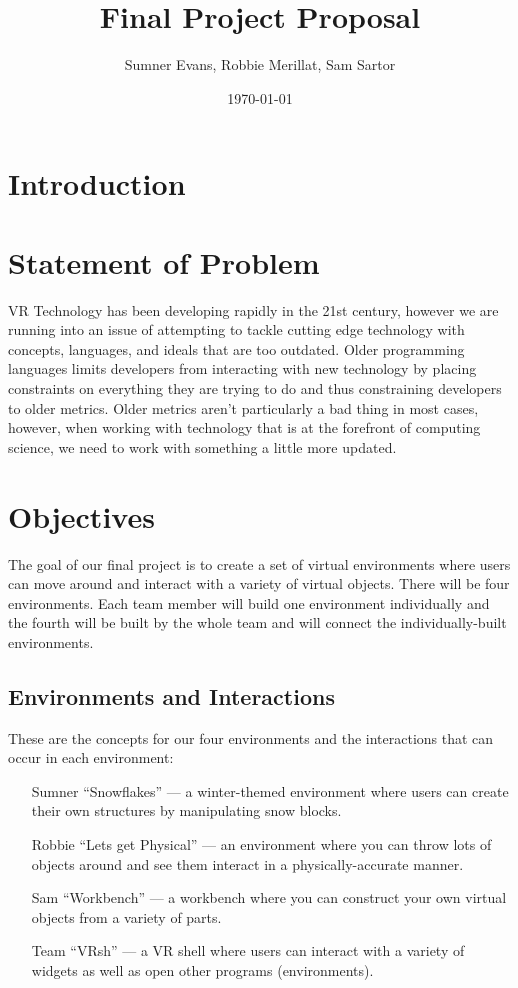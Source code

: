 \documentclass[titlepage,12pt]{article}
\title{Final Project Proposal}
\author{Sumner Evans, Robbie Merillat, Sam Sartor}
\date{\today}
\begin{document}
\maketitle

\section{Introduction}


\section{Statement of Problem}

VR Technology has been developing rapidly in the 21st century, however we are
running into an issue of attempting to tackle cutting edge technology with
concepts, languages, and ideals that are too outdated. Older programming
languages limits developers from interacting with new technology by placing
constraints on everything they are trying to do and thus constraining
developers to older metrics. Older metrics aren't particularly a bad thing
in most cases, however, when working with technology that is at the forefront
of computing science, we need to work with something a little more updated.

\section{Objectives}

The goal of our final project is to create a set of virtual environments where
users can move around and interact with a variety of virtual objects. There will
be four environments. Each team member will build one environment individually
and the fourth will be built by the whole team and will connect the
individually-built environments.

\subsection{Environments and Interactions}
These are the concepts for our four environments and the interactions that can
occur in each environment:

\begin{enumerate}[leftmargin=*]
    \item [Sumner] ``Snowflakes'' --- a winter-themed environment where users
        can create their own structures by manipulating snow blocks.
    \item [Robbie] ``Lets get Physical'' --- an environment where you can throw
        lots of objects around and see them interact in a physically-accurate
        manner.
    \item [Sam] ``Workbench'' --- a workbench where you can construct your own
        virtual objects from a variety of parts.
    \item [Team] ``VRsh'' --- a VR shell where users can interact with a variety
        of widgets as well as open other programs (environments).
\end{enumerate}
\end{document}
